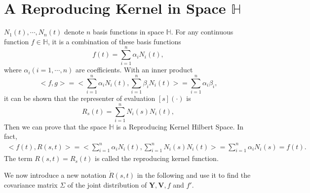 \section{A Reproducing Kernel in Space $\mathbb{H}$}

$N_1(t), \cdots, N_n(t)$ denote $n$ basis functions in space $\mathbb{H}$. For any continuous function $f \in \mathbb{H}$, it is a combination of these basis functions
\begin{equation*}
f(t)=\sum_{i=1}^{n} \alpha_iN_i(t),
\end{equation*}
where $\alpha_i (i=1, \cdots, n)$ are coefficients. With an inner product 
\begin{equation}
<f,g>= <\sum_{i=1}^{n} \alpha_iN_i(t), \sum_{i=1}^{n} \beta_iN_i(t)>=\sum_{i=1}^{n} \alpha_i \beta_i, 
\end{equation}
it can be shown that the representer of evaluation $[s](\cdot)$ is
\begin{equation}
R_s(t) = \sum_{i=1}^{n} N_i(s)N_i(t),
\end{equation}
Then we can prove that the space $\mathbb{H}$ is a Reproducing Kernel Hilbert Space. In fact,
\begin{align*}
<f(t), R(s,t)>=<\sum_{i=1}^{n} \alpha_iN_i(t),  \sum_{i=1}^{n} N_i(s)N_i(t)>=\sum_{i=1}^{n}\alpha_iN_i(s)=f(t).
\end{align*}
The term $R(s,t)=R_s(t)$ is called the reproducing kernel function.


We now introduce a new notation $\dot{R}(s,t)$ in the following and use it to find the covariance matrix $\Sigma$ of the joint distribution of $\mathbf{Y}, \mathbf{V}, f$ and $f'$.

